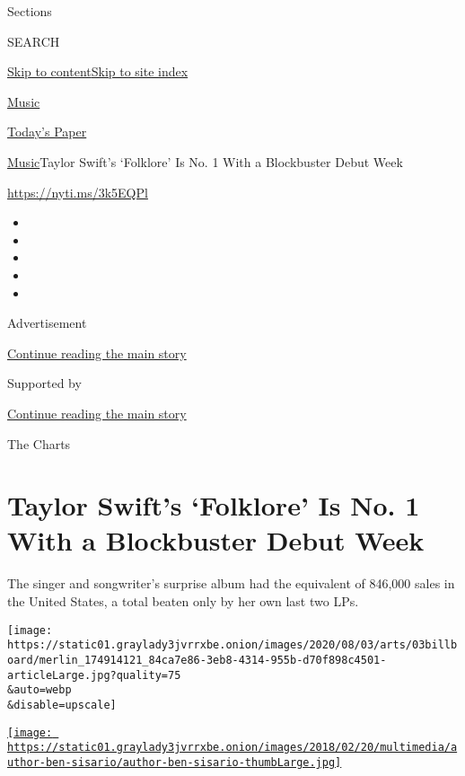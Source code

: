 Sections

SEARCH

\protect\hyperlink{site-content}{Skip to
content}\protect\hyperlink{site-index}{Skip to site index}

\href{https://www.nytimes3xbfgragh.onion/section/arts/music}{Music}

\href{https://myaccount.nytimes3xbfgragh.onion/auth/login?response_type=cookie\&client_id=vi}{}

\href{https://www.nytimes3xbfgragh.onion/section/todayspaper}{Today's
Paper}

\href{/section/arts/music}{Music}\textbar{}Taylor Swift's `Folklore' Is
No. 1 With a Blockbuster Debut Week

\url{https://nyti.ms/3k5EQPl}

\begin{itemize}
\item
\item
\item
\item
\item
\end{itemize}

Advertisement

\protect\hyperlink{after-top}{Continue reading the main story}

Supported by

\protect\hyperlink{after-sponsor}{Continue reading the main story}

The Charts

\hypertarget{taylor-swifts-folklore-is-no-1-with-a-blockbuster-debut-week}{%
\section{Taylor Swift's `Folklore' Is No. 1 With a Blockbuster Debut
Week}\label{taylor-swifts-folklore-is-no-1-with-a-blockbuster-debut-week}}

The singer and songwriter's surprise album had the equivalent of 846,000
sales in the United States, a total beaten only by her own last two LPs.

\texttt{[image: https://static01.graylady3jvrrxbe.onion/images/2020/08/03/arts/03billboard/merlin\_174914121\_84ca7e86-3eb8-4314-955b-d70f898c4501-articleLarge.jpg?quality=75\\\&auto=webp\\\&disable=upscale]}

\href{https://www.nytimes3xbfgragh.onion/by/ben-sisario}{\texttt{[image: https://static01.graylady3jvrrxbe.onion/images/2018/02/20/multimedia/author-ben-sisario/author-ben-sisario-thumbLarge.jpg]}}

